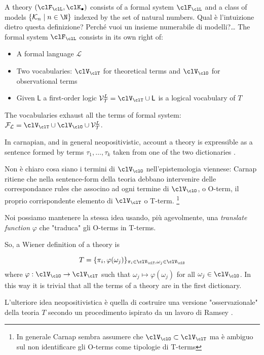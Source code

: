 \begin{definition}
	A theory $(\clF_\clL, \clK_\bullet)$ consists of a formal system $\clF_\clL$ and a class of models $\{\mathcal{K}_n \mid n \in \N \}$ indexed by the set of natural numbers. 
	{\color{red} Qual è l'intuizione dietro questa definizione? Perché vuoi un insieme numerabile di modelli?\dots}
	The formal system $\clF_\clL$ consists in its own right of:
	\begin{itemize}
		\item A formal language $\mathcal{L}$ 
		\item Two vocabularies: $\clV_\clT$ for theoretical terms and $\clV_\clO$ for observational terms 
		\item Given $\mathsf{L}$ a first-order logic $\mathcal{V}_{\mathcal{T}}^L = \clV_\clT \cup \mathsf{L}$ is a logical vocabulary of $T$
	\end{itemize}    
\end{definition}
The vocabularies exhaust all the terms of formal system: $\mathcal{F_L} = \clV_\clT \cup \clV_\clO \cup \mathcal{V}_{\mathcal{T}}^L$.

In carnapian, and in general neopositivistic, account a theory is expressible as a sentence formed by terms $\tau_1, \dots, \tau_k$ taken from one of the two dictionaries \cite{?}. 

Non è chiaro cosa siano i termini di $\clV_\clO$ nell'epistemologia viennese: Carnap ritiene che nella sentence-form della teoria debbano intervenire delle correspondance rules che associno ad ogni termine di $\clV_\clO$, o O-term, il proprio corrispondente elemento di $\clV_\clT$ o T-term. \footnote{In generale Carnap sembra assumere che $\clV_\clO \subset \clV_\clT$ ma è ambiguo sul non identificare gli O-terms come tipologie di T-terms}

Noi possiamo mantenere la stessa idea usando, più agevolmente, una \emph{translate function} $\varphi$ che "traduca" gli O-terms in T-terms. 

So, a Wiener definition of a theory is 

\[  T = \{ \pi_i, \varphi (\omega_j)\}_{\pi_i \in \clV_\clT, \omega_j \in \clV_\clO}
\] 
where $\varphi: \clV_\clO \to \clV_\clT$ such that $\omega_j \mapsto \varphi (\omega_j)$ for all $\omega_j \in \clV_\clO$. In this way it is trivial that all the terms of a theory are in the first dictionary.

L'ulteriore idea neopositivistica è quella di costruire una versione "osservazionale" della teoria $T$ secondo un procedimento ispirato da un lavoro di Ramsey \cite{?}.


